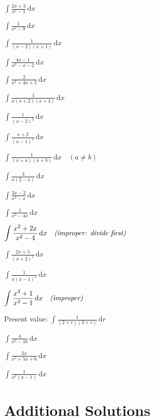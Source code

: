 \begin{problems}
  \item $\displaystyle\int \frac{2x+3}{x^{2}-1}\,\mathrm{d}x$
  \item $\displaystyle\int \frac{1}{x^{2}-9}\,\mathrm{d}x$
  \item $\displaystyle\int \frac{1}{(x-2)(x+1)}\,\mathrm{d}x$
  \item $\displaystyle\int \frac{4x-1}{x^{2}-x-2}\,\mathrm{d}x$
  \item $\displaystyle\int \frac{2}{x^{2}+4x+3}\,\mathrm{d}x$
  \item $\displaystyle\int \frac{1}{x(x+2)(x+4)}\,\mathrm{d}x$
  \item $\displaystyle\int \frac{1}{(x-2)^{2}}\,\mathrm{d}x$
  \item $\displaystyle\int \frac{x+2}{(x-1)^{2}}\,\mathrm{d}x$
  \item $\displaystyle\int \frac{1}{(x+a)(x+b)}\,\mathrm{d}x \quad (a\neq b)$
  \item $\displaystyle\int \frac{3}{x(2-x)}\,\mathrm{d}x$
  \item $\displaystyle\int \frac{3x-2}{x^{2}-x}\,\mathrm{d}x$
  \item $\displaystyle\int \frac{1}{x^{3}-4x}\,\mathrm{d}x$
  \item $\displaystyle\int \frac{x^{2}+2x}{x^{2}-4}\,\mathrm{d}x \quad \emph{(improper: divide first)}$
  \item $\displaystyle\int \frac{2x+5}{(x+2)^{2}}\,\mathrm{d}x$
  \item $\displaystyle\int \frac{1}{x(x-1)^{2}}\,\mathrm{d}x$
  \item $\displaystyle\int \frac{x^{3}+1}{x^{2}-1}\,\mathrm{d}x \quad \emph{(improper)}$
  \item Present value: $\displaystyle\int \frac{1}{(2+r)(3+r)}\,\mathrm{d}r$
  \item $\displaystyle\int \frac{4}{x^{2}-16}\,\mathrm{d}x$
  \item $\displaystyle\int \frac{2x}{x^{2}+5x+6}\,\mathrm{d}x$
  \item $\displaystyle\int \frac{1}{x^{2}(x-1)}\,\mathrm{d}x$
\end{problems}

\section{Additional Solutions}

